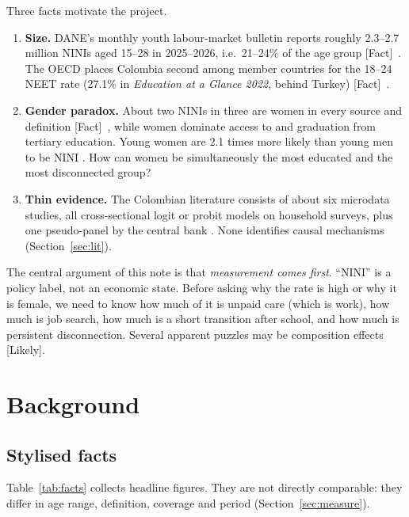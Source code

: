 \documentclass[11pt]{article}
\newcommand{\fact}{\textcolor{green!45!black}{\textsf{\footnotesize[Fact]}}}
\newcommand{\likely}{\textcolor{orange!80!black}{\textsf{\footnotesize[Likely]}}}
\begin{document}
Three facts motivate the project.

\begin{enumerate}
\item \textbf{Size.} DANE's monthly youth labour-market bulletin reports roughly 2.3--2.7 million NINIs aged 15--28 in 2025--2026, i.e.\ 21--24\% of the age group \fact\ \citep{dane2026}. The OECD places Colombia second among member countries for the 18--24 NEET rate (27.1\% in \textit{Education at a Glance 2022}, behind Turkey) \fact\ \citep{oecd2022}.
\item \textbf{Gender paradox.} About two NINIs in three are women in every source and definition \fact\ \citep{dane2026,ilo2024col,oecd2022}, while women dominate access to and graduation from tertiary education. Young women are 2.1 times more likely than young men to be NINI \citep{oecdgender}. How can women be simultaneously the most educated and the most disconnected group?
\item \textbf{Thin evidence.} The Colombian literature consists of about six microdata studies, all cross-sectional logit or probit models on household surveys, plus one pseudo-panel by the central bank \citep{lasso2026}. None identifies causal mechanisms (Section~\ref{sec:lit}).
\end{enumerate}

The central argument of this note is that \emph{measurement comes first}. ``NINI'' is a policy label, not an economic state. Before asking why the rate is high or why it is female, we need to know how much of it is unpaid care (which is work), how much is job search, how much is a short transition after school, and how much is persistent disconnection. Several apparent puzzles may be composition effects \likely.

\section{Background}

\subsection{Stylised facts}

Table~\ref{tab:facts} collects headline figures. They are not directly comparable: they differ in age range, definition, coverage and period (Section~\ref{sec:measure}).
\end{document}
